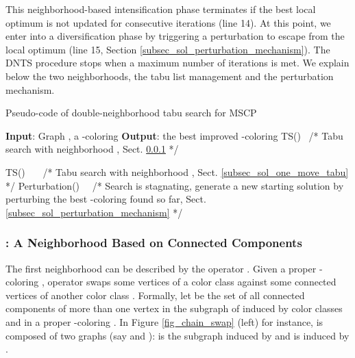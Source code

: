 \documentclass{elsart}
\begin{document}
This neighborhood-based intensification phase terminates if the best local optimum is not updated for  consecutive iterations (line 14). At this point, we enter into a diversification phase by triggering a perturbation to escape from the local optimum (line 15, Section \ref{subsec_sol_perturbation_mechanism}). The DNTS procedure stops when a maximum number of iterations  is met. We explain below the two neighborhoods, the tabu list management and the perturbation mechanism. 


\begin{algorithm}[h]
\begin{small}
 \caption{Pseudo-code of double-neighborhood tabu search for MSCP}\label{Algo_tabu}
 \begin{algorithmic}[1]
   \STATE \sf \textbf{Input}: Graph , a -coloring 
   \STATE \textbf{Output}: the best improved -coloring
   \STATE   
       \REPEAT
            \STATE    TS()   \   /* Tabu search with neighborhood , Sect. \ref{SectN2} */
           \IF{} 
                   \STATE                   
          \ENDIF

          \STATE   TS()     \ \ \ /* Tabu search with neighborhood , Sect.  \ref{subsec_sol_one_move_tabu} */
           \IF{} 
                   \STATE                   
          \ENDIF
     \STATE  Perturbation()            \ \ /* Search is stagnating, generate a new starting solution by perturbing the best -coloring found so far, Sect. \ref{subsec_sol_perturbation_mechanism} */
   \ENDWHILE

 \end{algorithmic}
 \end{small}
\end{algorithm}













\subsubsection{: A Neighborhood Based on Connected Components}
\label{SectN2}

The first neighborhood  can be described by the operator . Given a proper -coloring , operator  swaps some vertices of a color class  against some connected vertices of another color class . Formally, let  be the set of all connected components of more than one vertex in the subgraph of  induced by color classes  and  in a proper -coloring . In Figure \ref{fig_chain_swap} (left) for instance,  is composed of two graphs (say  and ):  is the subgraph induced by  and  is induced by .
\end{document}
